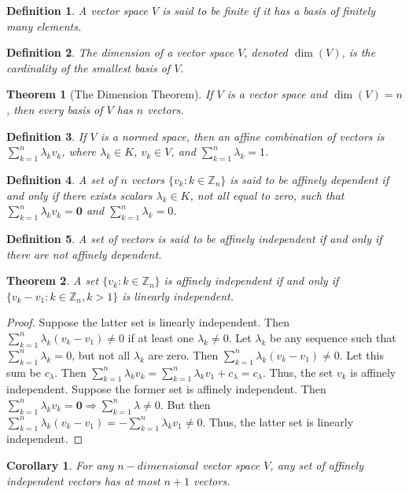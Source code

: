 \documentclass[crop=false,class=book]{standalone}
\theoremstyle{mystyle}
\newtheorem{theorem}{Theorem}[section]
\newtheorem{definition}{Definition}[section]
\newtheorem{corollary}{Corollary}[section]
\begin{document}
\begin{definition}
A vector space $V$ is said to be finite if it has a basis of finitely many elements.
\end{definition}
\begin{definition}
The dimension of a vector space $V$, denoted $\dim(V)$, is the cardinality of the smallest basis of $V$.
\end{definition}
\begin{theorem}[The Dimension Theorem]
If $V$ is a vector space and $\dim(V)=n$, then every basis of $V$ has $n$ vectors.
\end{theorem}
\begin{definition}
If $V$ is a normed space, then an affine combination of vectors is $\sum_{k=1}^{n} \lambda_k v_k$, where $\lambda_k \in K$, $v_k \in V$, and $\sum_{k=1}^{n} \lambda_k = 1$.
\end{definition}
\begin{definition}
A set of $n$ vectors $\{v_k:k\in \mathbb{Z}_n\}$ is said to be affinely dependent if and only if there exists scalars $\lambda_k \in K$, not all equal to zero, such that $\sum_{k=1}^{n} \lambda_k v_k = \mathbf{0}$ and $\sum_{k=1}^{n} \lambda_k = 0$.
\end{definition}
\begin{definition}
A set of vectors is said to be affinely independent if and only if there are not affinely dependent.
\end{definition}
\begin{theorem}
A set $\{v_k:k\in \mathbb{Z}_n\}$ is affinely independent if and only if $\{v_k-v_1:k\in \mathbb{Z}_n, k>1\}$ is linearly independent.
\end{theorem}
\begin{proof}
Suppose the latter set is linearly independent. Then $\sum_{k=1}^{n} \lambda_k(v_k-v_1) \ne 0$ if at least one $\lambda_k \ne 0$. Let $\lambda_k$ be any sequence such that $\sum_{k=1}^{n} \lambda_k = 0$, but not all $\lambda_k$ are zero. Then $\sum_{k=1}^{n} \lambda_k(v_k-v_1)\ne 0$. Let this sum be $c_{\lambda}$. Then $\sum_{k=1}^{n} \lambda_k v_k = \sum_{k=1}^{n} \lambda_k v_1 + c_\lambda = c_{\lambda}$. Thus, the set $v_k$ is affinely independent. Suppose the former set is affinely independent. Then $\sum_{k=1}^{n} \lambda_k v_k = \mathbf{0} \Rightarrow \sum_{k=1}^{n} \lambda \ne 0$. But then $\sum_{k=1}^{n}\lambda_k (v_k-v_1) = - \sum_{k=1}^{n} \lambda_k v_1 \ne 0$. Thus, the latter set is linearly independent.
\end{proof}
\begin{corollary}
For any $n-dimensional$ vector space $V$, any set of affinely independent vectors has at most $n+1$ vectors.
\end{corollary}
\end{document}
